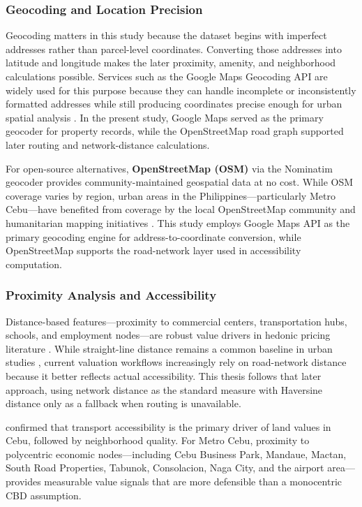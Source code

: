 \subsubsection{Geocoding and Location Precision}\label{geocoding-and-location-precision}

Geocoding matters in this study because the dataset begins with imperfect addresses rather than parcel-level coordinates. Converting those addresses into latitude and longitude makes the later proximity, amenity, and neighborhood calculations possible. Services such as the Google Maps Geocoding API are widely used for this purpose because they can handle incomplete or inconsistently formatted addresses while still producing coordinates precise enough for urban spatial analysis \parencite{googlemaps2025}. In the present study, Google Maps served as the primary geocoder for property records, while the OpenStreetMap road graph supported later routing and network-distance calculations.

For open-source alternatives, \textbf{OpenStreetMap (OSM)} via the Nominatim geocoder provides community-maintained geospatial data at no cost. While OSM coverage varies by region, urban areas in the Philippines---particularly Metro Cebu---have benefited from coverage by the local OpenStreetMap community and humanitarian mapping initiatives \parencite{hot2024}. This study employs Google Maps API as the primary geocoding engine for address-to-coordinate conversion, while OpenStreetMap supports the road-network layer used in accessibility computation.

\subsubsection{Proximity Analysis and Accessibility}\label{proximity-analysis-and-accessibility}

Distance-based features---proximity to commercial centers, transportation hubs, schools, and employment nodes---are robust value drivers in hedonic pricing literature \parencite{rosen1974,malpezzi2003}. While straight-line distance remains a common baseline in urban studies \parencite{sinnott1984}, current valuation workflows increasingly rely on road-network distance because it better reflects actual accessibility. This thesis follows that later approach, using network distance as the standard measure with Haversine distance only as a fallback when routing is unavailable.

\textcite{agosto2020} confirmed that transport accessibility is the primary driver of land values in Cebu, followed by neighborhood quality. For Metro Cebu, proximity to polycentric economic nodes---including Cebu Business Park, Mandaue, Mactan, South Road Properties, Tabunok, Consolacion, Naga City, and the airport area---provides measurable value signals that are more defensible than a monocentric CBD assumption.

